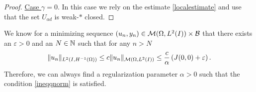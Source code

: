 \begin{proof}
\underline{Case $\gamma = 0$}. In this case we rely on the estimate \eqref{localestimate} and use that the set $U_{ad}$ is weak-$*$ closed.
\end{proof}
\begin{rmk}
 We know for a minimizing sequence $(u_n, y_n)\in \mathcal{M}(\Omega, L^{2}(I))\times \mathcal B$ that there exists an $\varepsilon > 0$ and an $N \in \mathbb{N} $ such that for any $n > N$
 \[
\lVert u_n\rVert_{L^2(I,H^{-1}(\Omega))} \leq c\lVert u_n\rVert_{\mathcal{M}(\Omega, L^{2}(I))} \leq \frac{c}{\alpha}\left(J(0,0) + \varepsilon \right).
 \]
 Therefore, we can always find a regularization parameter $\alpha>0$ such that the condition \eqref{ineqqnorm} is satisfied.
\end{rmk}

